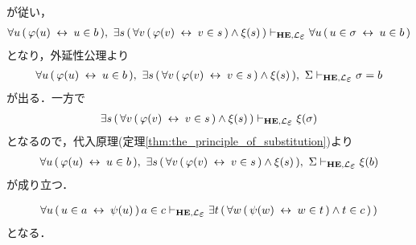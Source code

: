 \begin{metaprf}
\begin{description}
\begin{description}
						が従い，
						\begin{align}
							\forall u\, (\, \varphi(u) \lrarrow u \in b\, ),\ 
							\exists s\, (\, \forall v\, (\, \varphi(v) \lrarrow v \in s\, ) \wedge \xi(s)\, )
							\provable{\mbox{{\bf HE}},\lang{\varepsilon}} \forall u\, (\, u \in \sigma \lrarrow u \in b\, )
						\end{align}
						となり，外延性公理より
						\begin{align}
							\forall u\, (\, \varphi(u) \lrarrow u \in b\, ),\ 
							\exists s\, (\, \forall v\, (\, \varphi(v) \lrarrow v \in s\, ) \wedge \xi(s)\, ),\ 
							\Sigma
							\provable{\mbox{{\bf HE}},\lang{\varepsilon}} \sigma = b
						\end{align}
						が出る．一方で
						\begin{align}
							\exists s\, (\, \forall v\, (\, \varphi(v) \lrarrow v \in s\, ) \wedge \xi(s)\, )
							\provable{\mbox{{\bf HE}},\lang{\varepsilon}} \xi(\sigma)
						\end{align}
						となるので，代入原理(定理\ref{thm:the_principle_of_substitution})より
						\begin{align}
							\forall u\, (\, \varphi(u) \lrarrow u \in b\, ),\ 
							\exists s\, (\, \forall v\, (\, \varphi(v) \lrarrow v \in s\, ) \wedge \xi(s)\, ),\ 
							\Sigma
							\provable{\mbox{{\bf HE}},\lang{\varepsilon}} \xi(b)
						\end{align}
						が成り立つ．
						
						
						\begin{align}
							\forall u\, (\, u \in a \lrarrow \psi(u)\, )\, a \in c
							\provable{\mbox{{\bf HE}},\lang{\varepsilon}} \exists t\, (\, \forall w\, (\, \psi(w) \lrarrow w \in t\, ) \wedge t \in c\, )\, )
						\end{align}
						となる．
						

\end{description}
\end{description}
\end{metaprf}
